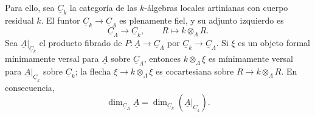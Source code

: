 Para ello, sea $\underline C_k$ la categoría de las $k$-álgebras
locales artinianas con cuerpo residual $k$. El funtor
$\underline C_k\longrightarrow\underline C_\Lambda$ es plenamente
fiel, y su adjunto izquierdo es
\[
 \underline C_\Lambda\longrightarrow\underline C_k,
 \qquad R\longmapsto k\otimes_\Lambda R.
\]
Sea $\underline A|_{\underline C_k}$ el producto fibrado de
$P:\underline A\longrightarrow\underline C_\Lambda$ por
$\underline C_k\longrightarrow\underline C_\Lambda$. Si $\xi$ es un
objeto formal mínimamente versal para $\underline A$ sobre
$\underline C_\Lambda$, entonces $k\otimes_\Lambda\xi$ es
mínimamente versal para $\underline A|_{\underline C_k}$ sobre
$\underline C_k$; la flecha
$\xi\longrightarrow k\otimes_\Lambda\xi$ es cocartesiana sobre
$R\longrightarrow k\otimes_\Lambda R$. En consecuencia,
\[
 \dim_{\underline C_\Lambda}\underline A
 =\dim_{\underline C_k}(\underline A|_{\underline C_k}).
\]

